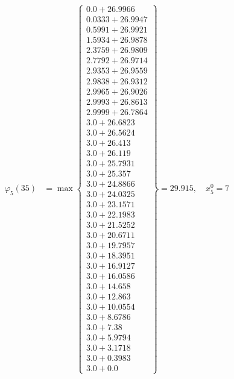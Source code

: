 \documentclass{article}
\begin{document}
\begin{align*}
  
\varphi_{5}(35) &= \max \left\{ \begin{array}{c}
0.0 + 26.9966 \\
 0.0333 + 26.9947 \\
 0.5991 + 26.9921 \\
 1.5934 + 26.9878 \\
 2.3759 + 26.9809 \\
 2.7792 + 26.9714 \\
 2.9353 + 26.9559 \\
 2.9838 + 26.9312 \\
 2.9965 + 26.9026 \\
 2.9993 + 26.8613 \\
 2.9999 + 26.7864 \\
 3.0 + 26.6823 \\
 3.0 + 26.5624 \\
 3.0 + 26.413 \\
 3.0 + 26.119 \\
 3.0 + 25.7931 \\
 3.0 + 25.357 \\
 3.0 + 24.8866 \\
 3.0 + 24.0325 \\
 3.0 + 23.1571 \\
 3.0 + 22.1983 \\
 3.0 + 21.5252 \\
 3.0 + 20.6711 \\
 3.0 + 19.7957 \\
 3.0 + 18.3951 \\
 3.0 + 16.9127 \\
 3.0 + 16.0586 \\
 3.0 + 14.658 \\
 3.0 + 12.863 \\
 3.0 + 10.0554 \\
 3.0 + 8.6786 \\
 3.0 + 7.38 \\
 3.0 + 5.9794 \\
 3.0 + 3.1718 \\
 3.0 + 0.3983 \\
 3.0 + 0.0
\end{array} \right\}=29.915,\quad x_{5}^0=7\\
  
  
  

\end{align*}
\end{document}
